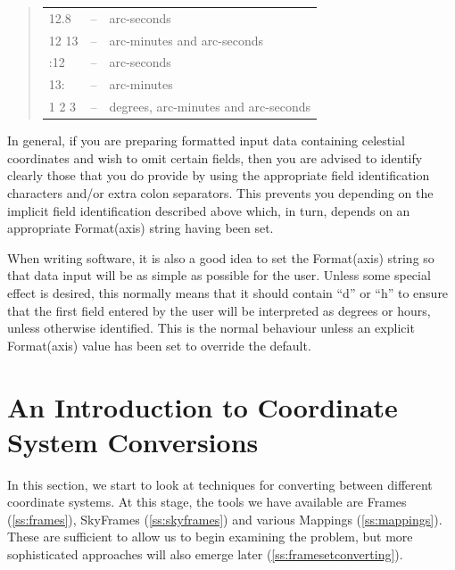 \documentclass[twoside,11pt]{article}
\newcommand{\secref}[1]{\S\ref{#1}}
\renewcommand{\secref}[1]{\ref{#1}}
\begin{document}
\begin{quote}
\begin{tabular}{lll}
12.8 & -- & arc-seconds \\
12 13 & -- & arc-minutes and arc-seconds \\
:12 & -- & arc-seconds \\
13: & -- & arc-minutes \\
1 2 3 & -- & degrees, arc-minutes and arc-seconds
\end{tabular}
\end{quote}

In general, if you are preparing formatted input data containing
celestial coordinates and wish to omit certain fields, then you are
advised to identify clearly those that you do provide by using the
appropriate field identification characters and/or extra colon
separators. This prevents you depending on the implicit field
identification described above which, in turn, depends on an
appropriate Format(axis) string having been set.

When writing software, it is also a good idea to set the Format(axis)
string so that data input will be as simple as possible for the
user. Unless some special effect is desired, this normally means that
it should contain ``d'' or ``h'' to ensure that the first field
entered by the user will be interpreted as degrees or hours, unless
otherwise identified. This is the normal behaviour unless an explicit
Format(axis) value has been set to override the default.


\cleardoublepage
\section{\label{ss:introducingconversion}An Introduction to Coordinate System Conversions}

In this section, we start to look at techniques for converting between
different coordinate systems.  At this stage, the tools we have
available are Frames (\secref{ss:frames}), SkyFrames
(\secref{ss:skyframes}) and various Mappings
(\secref{ss:mappings}). These are sufficient to allow us to begin
examining the problem, but more sophisticated approaches will also
emerge later (\secref{ss:framesetconverting}).
\end{document}
